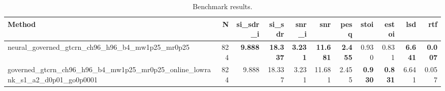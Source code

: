 \begin{table}[t]
\centering
\caption{Benchmark results.}
\label{tab:bench}
\begin{tabular}{lrrrrrrrrrr}
\toprule
Method & N & si\_sdr\_i & si\_sdr & snr\_i & snr & pesq & stoi & estoi & lsd & rtf \\
\midrule
neural_governed_gtcrn_ch96_h96_b4_mw1p25_mr0p25 & 824 & \textbf{9.888} & \textbf{18.337} & \textbf{3.231} & \textbf{11.681} & \textbf{2.455} & 0.930 & 0.831 & \textbf{6.641} & \textbf{0.007} \\
governed_gtcrn_ch96_h96_b4_mw1p25_mr0p25_online_lowrank_s1_a2_d0p01_go0p0001 & 824 & 9.888 & 18.337 & 3.231 & 11.681 & 2.455 & \textbf{0.930} & \textbf{0.831} & 6.641 & 0.057 \\
\bottomrule
\end{tabular}
\end{table}